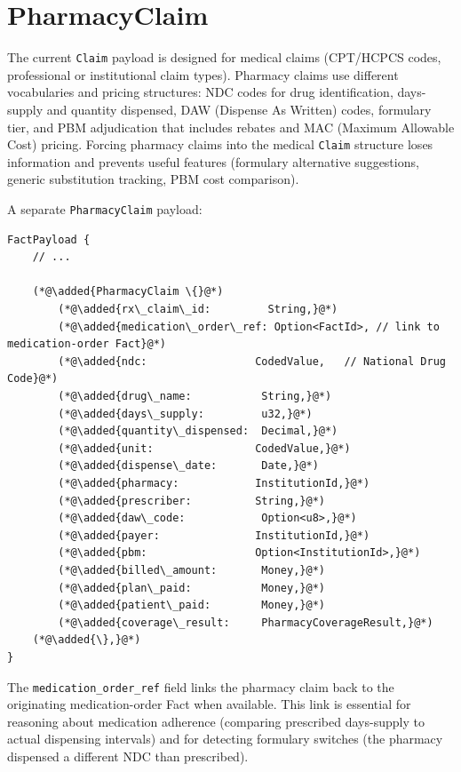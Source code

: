 \documentclass[11pt]{article}
\newcommand{\added}[1]{\textcolor{accentblue}{#1}}
\begin{document}
\section{PharmacyClaim}
\label{sec:pharmacy}

The current \texttt{Claim} payload is designed for medical claims
(CPT/HCPCS codes, professional or institutional claim types). Pharmacy
claims use different vocabularies and pricing structures: NDC codes for
drug identification, days-supply and quantity dispensed, DAW (Dispense
As Written) codes, formulary tier, and PBM adjudication that includes
rebates and MAC (Maximum Allowable Cost) pricing. Forcing pharmacy
claims into the medical \texttt{Claim} structure loses information and
prevents useful features (formulary alternative suggestions, generic
substitution tracking, PBM cost comparison).

A separate \texttt{PharmacyClaim} payload:

\begin{lstlisting}
FactPayload {
    // ...

    (*@\added{PharmacyClaim \{}@*)
        (*@\added{rx\_claim\_id:         String,}@*)
        (*@\added{medication\_order\_ref: Option<FactId>, // link to medication-order Fact}@*)
        (*@\added{ndc:                 CodedValue,   // National Drug Code}@*)
        (*@\added{drug\_name:           String,}@*)
        (*@\added{days\_supply:         u32,}@*)
        (*@\added{quantity\_dispensed:  Decimal,}@*)
        (*@\added{unit:                CodedValue,}@*)
        (*@\added{dispense\_date:       Date,}@*)
        (*@\added{pharmacy:            InstitutionId,}@*)
        (*@\added{prescriber:          String,}@*)
        (*@\added{daw\_code:            Option<u8>,}@*)
        (*@\added{payer:               InstitutionId,}@*)
        (*@\added{pbm:                 Option<InstitutionId>,}@*)
        (*@\added{billed\_amount:       Money,}@*)
        (*@\added{plan\_paid:           Money,}@*)
        (*@\added{patient\_paid:        Money,}@*)
        (*@\added{coverage\_result:     PharmacyCoverageResult,}@*)
    (*@\added{\},}@*)
}
\end{lstlisting}

The \texttt{medication\_order\_ref} field links the pharmacy claim back to
the originating medication-order Fact when available. This link is
essential for reasoning about medication adherence (comparing prescribed
days-supply to actual dispensing intervals) and for detecting formulary
switches (the pharmacy dispensed a different NDC than prescribed).
\end{document}
